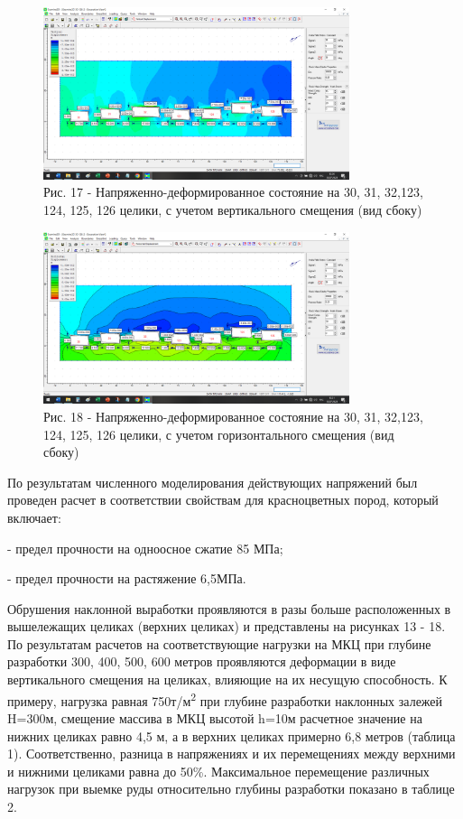 \begin{figure}[H]
	\centering
	\includegraphics[width=0.8\textwidth]{media/gor/image20}
	\caption*{Рис. 17 - Напряженно-деформированное состояние на 30, 31,
	32,123, 124, 125, 126 целики, с учетом вертикального смещения (вид сбоку)}
\end{figure}



\begin{figure}[H]
	\centering
	\includegraphics[width=0.8\textwidth]{media/gor/image21}
	\caption*{Рис. 18 - Напряженно-деформированное состояние на 30, 31,
	32,123, 124, 125, 126 целики, с учетом горизонтального смещения (вид сбоку)}
\end{figure}


По результатам численного моделирования действующих напряжений был
проведен расчет в соответствии свойствам для красноцветных пород,
который включает:

- предел прочности на одноосное сжатие 85 МПа;

- предел прочности на растяжение 6,5МПа.

Обрушения наклонной выработки проявляются в разы больше расположенных в
вышележащих целиках (верхних целиках) и представлены на рисунках 13 -
18. По результатам расчетов на соответствующие нагрузки на МКЦ при
глубине разработки 300, 400, 500, 600 метров проявляются деформации в
виде вертикального смещения на целиках, влияющие на их несущую
способность. К примеру, нагрузка равная 750т/м\textsuperscript{2} при
глубине разработки наклонных залежей H=300м, смещение массива в МКЦ
высотой h=10м расчетное значение на нижних целиках равно 4,5 м, а в
верхних целиках примерно 6,8 метров (таблица 1). Соответственно, разница
в напряжениях и их перемещениях между верхними и нижними целиками равна
до 50\%. Максимальное перемещение различных нагрузок при выемке руды
относительно глубины разработки показано в таблице 2.

